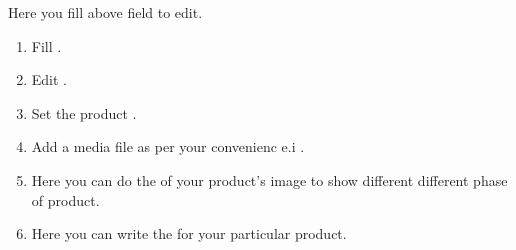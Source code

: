 \documentclass[a4paper,10pt,english]{report}
\begin{document}
Here you fill above field to edit.
\begin{enumerate}
\def\theenumi{\arabic{enumi}}
\def\labelenumi{\theenumi .}
\makeatletter\def\p@enumii{\p@enumi \theenumi .}\makeatother
\item {} 
Fill .

\item {} 
Edit .

\item {} 
Set the product .

\item {} 
Add a media file as per your convenienc e.i .

\item {} 
Here you can do the  of your product’s image to show different different phase of product.

\item {} 
Here you can write the  for your particular product.

\end{enumerate}
\end{document}

